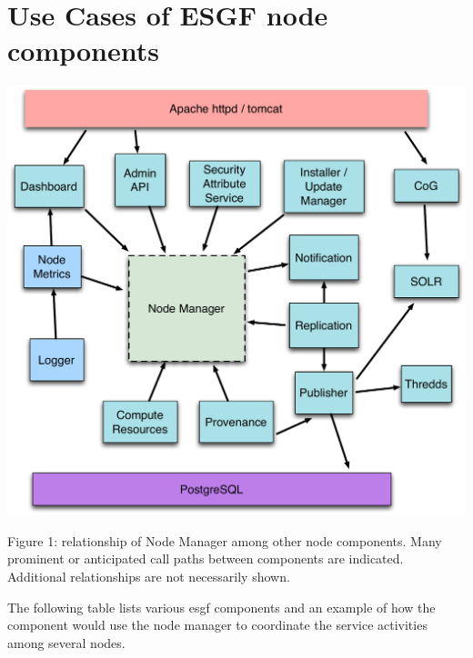 \documentclass[oneside,12pt]{memoir}
\begin{document}
\section{Use Cases of ESGF node components}

\begin{center}
\includegraphics[width=\textwidth]{presentation/ESGF-node-components.pdf}

Figure 1:  relationship of Node Manager among other node components.  Many prominent or anticipated call paths between components are indicated.  Additional relationships are not necessarily shown.  
\end{center}


The following table lists various esgf components and an example of how the component would use the node manager to coordinate the service activities among several nodes.  \\
\\
\end{document}
